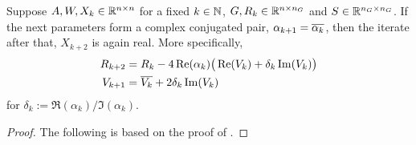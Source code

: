 \begin{proposition}
\label{thm:adi:ale:complex-pair}
  Suppose $A, W, X_k\in\mathbb{R}^{n\times n}$ for a fixed $k\in\mathbb{N}$,
  \ie $G, R_k \in \mathbb{R}^{n\times n_G}$ and $S\in\mathbb{R}^{n_G\times n_G}$.
  If the next parameters form a complex conjugated pair,
  $\alpha_{k+1} = \conj{\alpha_k}$,
  then the iterate after that, $X_{k+2}$ is again real.
  More specifically,
  \begin{align*}
    R_{k+2} &= R_k - 4\Re(\alpha_k) \big(
      \Re(V_k) + \delta_k \Im(V_k)
    \big) \\
    V_{k+1} &= \conj{V_k} + 2\delta_k \Im(V_k)
  \end{align*}
  for $\delta_k := \Re(\alpha_k) / \Im(\alpha_k)$.
\end{proposition}
\begin{proof}
  The following is based on the proof of \cite[Theorem~4.2]{Kuerschner2016}.
\end{proof}

